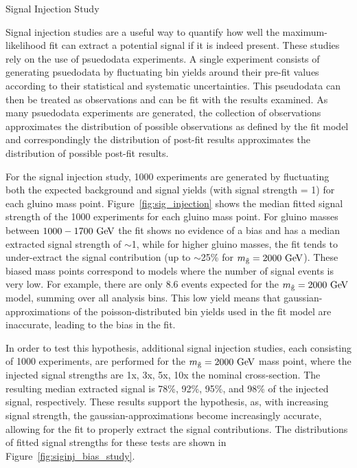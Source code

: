 \begin{subsection}{Signal Injection Study}

Signal injection studies are a useful way to quantify how well the maximum-likelihood fit can extract a potential signal if it is indeed present.
These studies rely on the use of psuedodata experiments.
A single experiment consists of generating psuedodata by fluctuating bin yields around their pre-fit values according to their statistical and systematic uncertainties.
This pseudodata can then be treated as observations and can be fit with the results examined.
As many psuedodata experiments are generated, the collection of observations approximates the distribution of possible observations as defined by the fit model and correspondingly the distribution of post-fit results approximates the distribution of possible post-fit results.

For the signal injection study, 1000 experiments are generated by fluctuating both the expected background and signal yields (with signal strength = 1) for each gluino mass point.
Figure~\ref{fig:sig_injection} shows the median fitted signal strength of the 1000 experiments for each gluino mass point.
For gluino masses between $1000 - 1700~\mathrm{Ge\kern -0.1em V}$ the fit shows no evidence of a bias and has a median extracted signal strength of $\sim$1, while for higher gluino masses, the fit tends to under-extract the signal contribution (up to $\sim$25\% for $m_{\tilde{\mathrm{g}}} = 2000~\mathrm{Ge\kern -0.1em V}$).
These biased mass points correspond to models where the number of signal events is very low.
For example, there are only 8.6 events expected for the $m_{\tilde{\mathrm{g}}} = 2000~\mathrm{Ge\kern -0.1em V}$ model, summing over all analysis bins.
This low yield means that gaussian-approximations of the poisson-distributed bin yields used in the fit model are inaccurate, leading to the bias in the fit.

In order to test this hypothesis, additional signal injection studies, each consisting of 1000 experiments, are performed for the $m_{\tilde{\mathrm{g}}} = 2000~\mathrm{Ge\kern -0.1em V}$ mass point, where the injected signal strengths are 1x, 3x, 5x, 10x the nominal cross-section.
The resulting median extracted signal is 78\%, 92\%, 95\%, and 98\% of the injected signal, respectively.
These results support the hypothesis, as, with increasing signal strength, the gaussian-approximations become increasingly accurate, allowing for the fit to properly extract the signal contributions.
The distributions of fitted signal strengths for these tests are shown in Figure~\ref{fig:siginj_bias_study}.


\end{subsection}
